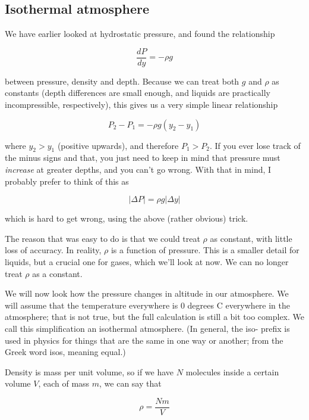 \subsection{Isothermal atmosphere}

We have earlier looked at hydrostatic pressure, and found the relationship

\begin{equation}
\frac{dP}{dy} = - \rho g
\end{equation}

between pressure, density and depth. Because we can treat both $g$ and $\rho$ as constants (depth differences are small enough, and liquids are practically incompressible, respectively), this gives us a very simple linear relationship

\begin{equation}
P_2 - P_1 = -\rho g (y_2 - y_1)
\end{equation}

where $y_2 > y_1$ (positive upwards), and therefore $P_1 > P_2$. If you ever lose track of the minus signs and that, you just need to keep in mind that pressure must \emph{increase} at greater depths, and you can't go wrong. With that in mind, I probably prefer to think of this as

\begin{equation}
|\Delta P| = \rho g |\Delta y|
\end{equation}

which is hard to get wrong, using the above (rather obvious) trick.

The reason that was easy to do is that we could treat $\rho$ as constant, with little loss of accuracy. In reality, $\rho$ is a function of pressure. This is a smaller detail for liquids, but a crucial one for gases, which we'll look at now. We can no longer treat $\rho$ as a constant.

We will now look how the pressure changes in altitude in our atmosphere. We will assume that the temperature everywhere is 0 degrees C everywhere in the atmosphere; that is not true, but the full calculation is still a bit too complex. We call this simplification an isothermal atmosphere. (In general, the iso- prefix is used in physics for things that are the same in one way or another; from the Greek word isos, meaning equal.)

Density is mass per unit volume, so if we have $N$ molecules inside a certain volume $V$, each of mass $m$, we can say that

\begin{equation}
\rho = \frac{N m}{V}
\end{equation}

